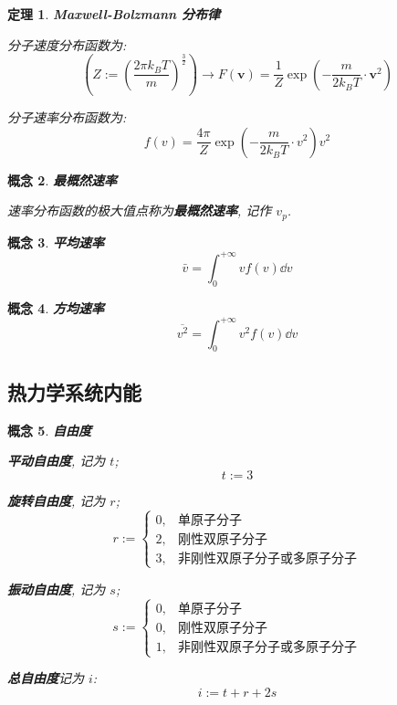 \documentclass[UTF8]{ctexart}
\newcommand{\<}{\langle}
\renewcommand{\>}{\rangle}                              %
\newenvironment{dfn_box}{
    \begin{tcolorbox}[enhanced, colback=dfn_green2, boxrule=0pt, frame hidden,
        borderline west={0.7mm}{0.1mm}{dfn_green1},breakable]
    }
    {\end{tcolorbox}}
\newenvironment{thm_box}{
    \begin{tcolorbox}[enhanced, colback=thm_blue2, boxrule=0pt, frame hidden,
        borderline west={0.7mm}{0.1mm}{thm_blue1},breakable]
    }
    {\end{tcolorbox}}
\theoremstyle{MyStyle} %
\newtheorem{definition}{概念}[subsection]
\newenvironment{cpt}{\begin{dfn_box}\begin{definition}}{\end{definition}\end{dfn_box}}
\newtheorem{theorem}[definition]{定理}
\newenvironment{thm}{\begin{thm_box}\begin{theorem}}{\end{theorem}\end{thm_box}}
\begin{document}
        \begin{thm}
            \textbf{Maxwell-Bolzmann 分布律}

            分子速度分布函数为: 
            \[\left(Z:={\left(\frac{2\pi k_B T}{m}\right)}^{\frac{3}{2}}\right)
            \to F(\bm{v})=\frac{1}{Z}\exp(-\frac{m}{2k_B T}\cdot\bm{v}^2)\]

            分子速率分布函数为: 
            \[f(v)=\frac{4\pi}{Z}\exp(-\frac{m}{2k_B T}\cdot v^2)v^2\]
        \end{thm}
        
        \begin{cpt}
            \textbf{最概然速率}

            速率分布函数的极大值点称为\textbf{最概然速率}, 记作 \(v_p\). 
        \end{cpt}
        
        \begin{cpt}
            \textbf{平均速率}
            \[\bar{v}=\int_0^{+\infty}vf(v)\dd v\]
        \end{cpt}
        
        \begin{cpt}
            \textbf{方均速率}
            \[\overline{v^2}=\int_0^{+\infty}v^2f(v)\dd v\]
        \end{cpt}

    \subsection{热力学系统内能}
        
        \begin{cpt}
            \textbf{自由度}

            \textbf{平动自由度}, 记为 \(t\); 
            \[t:=3\]

            \textbf{旋转自由度}, 记为 \(r\);
            \[r:=\begin{cases}
                0, & \text{单原子分子} \\
                2, & \text{刚性双原子分子} \\
                3, & \text{非刚性双原子分子或多原子分子}
            \end{cases}\]

            \textbf{振动自由度}, 记为 \(s\);
            \[s:=\begin{cases}
                0, & \text{单原子分子} \\
                0, & \text{刚性双原子分子} \\
                1, & \text{非刚性双原子分子或多原子分子}
            \end{cases}\]

            \textbf{总自由度}记为 \(i\): 
            \[i:=t+r+2s\]
        \end{cpt}
        
\end{document}
